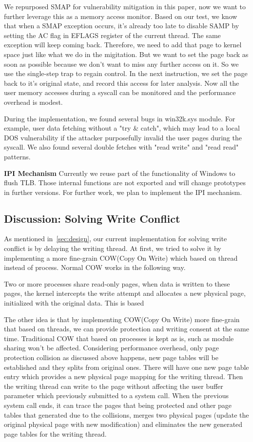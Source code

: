 We repurposed SMAP for vulnerability mitigation in this paper, now we want to further leverage this as a memory access monitor. Based on our test, we know that when a SMAP exception occurs, it's already too late to disable SAMP by setting the AC flag in EFLAGS register of the current thread. The same exception will keep coming back. Therefore, we need to add that page to kernel space just like what we do in the migitation. But we want to set the page back as soon as possible because we don't want to miss any further access on it. So we use the single-step trap to regain control. In the next instruction, we set the page back to it's original state, and record this access for later analysis. Now all the user memory accesses during a syscall can be monitored and the performance overhead is modest.

During the implementation, we found several bugs in win32k.sys module. For example, user data fetching without a "try \& catch", which may lead to a local DOS vulnerability if the attacker purposefully invalid the user pages during the syscall. We also found several double fetches with "read write" and "read read" patterns.

\textbf{IPI Mechanism  }Currently we reuse part of the functionality of Windows to flush TLB. Those internal functions are not exported and will change prototypes in further versions. For further work, we plan to implement the IPI mechanism.

\subsection{Discussion: Solving Write Conflict}

As mentioned in~\autoref{sec:design}, our current implementation for solving write conflict is by delaying the writing thread. At first, we tried to solve it by implementing a more fine-grain COW(Copy On Write) which based on thread instead of process. Normal COW works in the following way.

Two or more processes share read-only pages, when data is written to these pages, the kernel intercepts the write attempt and allocates a new physical page, initialized with the original data. This is based


The other idea is that by implementing COW(Copy On Write) more fine-grain that based on threads, we can provide protection and writing consent at the same time. Traditional COW that based on processes is kept as is, such as module sharing won't be affected. Considering performance overhead, only page protection collision as discussed above happens, new page tables will be established and they splits from original ones. There will have one new page table entry which provides a new physical page mapping for the writing thread. Then the writing thread can write to the page without affecting the user buffer parameter which previously submitted to a system call. When the previous system call ends, it can trace the pages that being protected and other page tables that generated due to the collisions, merges two physical pages (update the original physical page with new modification) and eliminates the new generated page tables for the writing thread.

